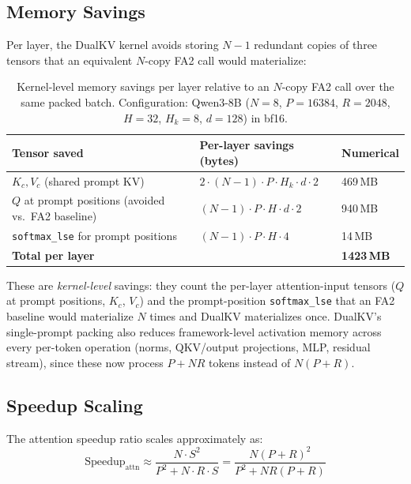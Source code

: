 \documentclass{article}
\begin{document}
\subsection{Memory Savings}
\label{app:theoretical-memory}

Per layer, the DualKV kernel avoids storing $N{-}1$ redundant copies of three tensors that an equivalent $N$-copy FA2 call would materialize:

\begin{table}[ht]
\centering
\small
\caption{Kernel-level memory savings per layer relative to an $N$-copy FA2 call over the same packed batch. Configuration: Qwen3-8B ($N{=}8$, $P{=}16384$, $R{=}2048$, $H{=}32$, $H_k{=}8$, $d{=}128$) in bf16.}
\label{tab:kernel-mem}
\begin{tabular}{@{}lll@{}}
\toprule
\textbf{Tensor saved} & \textbf{Per-layer savings (bytes)} & \textbf{Numerical} \\
\midrule
$K_c, V_c$ (shared prompt KV)         & $2 \cdot (N{-}1) \cdot P \cdot H_k \cdot d \cdot 2$ & 469\,MB \\
$Q$ at prompt positions (avoided vs.\ FA2 baseline) & $(N{-}1) \cdot P \cdot H \cdot d \cdot 2$ & 940\,MB \\
\texttt{softmax\_lse} for prompt positions & $(N{-}1) \cdot P \cdot H \cdot 4$              & 14\,MB \\
\midrule
\textbf{Total per layer}              &                                                      & \textbf{1423\,MB} \\
\bottomrule
\end{tabular}
\end{table}

These are \emph{kernel-level} savings: they count the per-layer attention-input tensors ($Q$ at prompt positions, $K_c$, $V_c$) and the prompt-position \texttt{softmax\_lse} that an FA2 baseline would materialize $N$ times and DualKV materializes once. DualKV's single-prompt packing also reduces framework-level activation memory across every per-token operation (norms, QKV/output projections, MLP, residual stream), since these now process $P + NR$ tokens instead of $N(P+R)$.

\subsection{Speedup Scaling}
\label{app:theoretical-speedup}

The attention speedup ratio scales approximately as:
\begin{equation}
  \text{Speedup}_{\text{attn}} \approx \frac{N \cdot S^2}{P^2 + N \cdot R \cdot S} = \frac{N(P+R)^2}{P^2 + NR(P+R)}
\end{equation}
\end{document}
